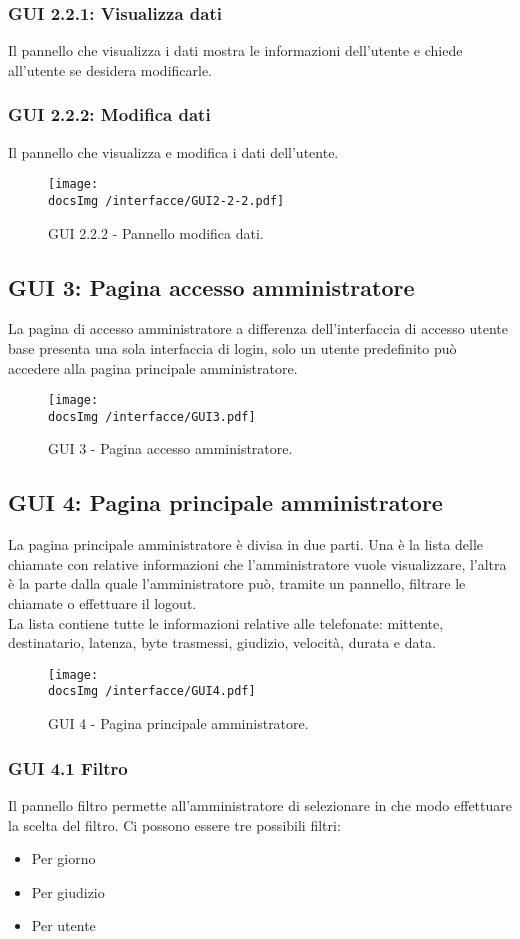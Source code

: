 \subsubsection{GUI 2.2.1: Visualizza dati}
Il pannello che visualizza i dati mostra le informazioni dell’utente e chiede all’utente se desidera modificarle.

\newpage
\subsubsection{GUI 2.2.2: Modifica dati}
Il pannello che visualizza e modifica i dati dell'utente.
\begin{figure}[htbp]
\centering
\texttt{[image: \\docsImg /interfacce/GUI2-2-2.pdf]}
\caption{GUI 2.2.2 - Pannello modifica dati.}
\end{figure}

\subsection{GUI 3: Pagina accesso amministratore}
La pagina di accesso amministratore a differenza dell’interfaccia di accesso utente base presenta una sola interfaccia di login, solo un utente predefinito può accedere alla pagina principale amministratore.
\begin{figure}[htbp]
\centering
\texttt{[image: \\docsImg /interfacce/GUI3.pdf]}
\caption{GUI 3 - Pagina accesso amministratore.}
\end{figure}

\newpage
\subsection{GUI 4: Pagina principale amministratore}
La pagina principale amministratore è divisa in due parti. Una è la lista delle chiamate con relative informazioni  che l’amministratore vuole visualizzare, l’altra è la parte dalla quale l’amministratore può, tramite un pannello, filtrare le chiamate o effettuare il logout.\\
La lista contiene tutte le informazioni relative alle telefonate: mittente, destinatario, latenza, byte trasmessi, giudizio, velocità, durata e data.
\begin{figure}[htbp]
\centering
\texttt{[image: \\docsImg /interfacce/GUI4.pdf]}
\caption{GUI 4 - Pagina principale amministratore.}
\end{figure}

\subsubsection{GUI 4.1 Filtro}
Il pannello filtro permette all’amministratore di selezionare in che modo effettuare la scelta del filtro. Ci possono essere tre possibili filtri:
\begin{itemize}
\item Per giorno
\item Per giudizio
\item Per utente
\end{itemize}

